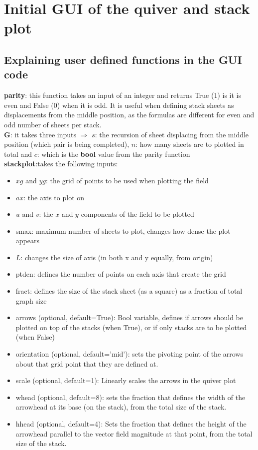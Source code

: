 \documentclass[11]{report}
\begin{document}
\section{Initial GUI of the quiver and stack plot}

\subsection{Explaining user defined functions in the GUI code}

\textbf{parity}: this function takes an input of an integer and returns True ($1$) is it is even and False ($0$) when it is odd. It is useful when defining stack sheets as displacements from the middle position, as the formulas are different for even and odd number of sheets per stack.\\
\textbf{G}: it takes three inputs $\Rightarrow$ $s$: the recursion of sheet displacing from the middle position (which pair is being completed), $n$: how many sheets are to plotted in total and $c$: which is the \textbf{bool} value from the parity function\\
\textbf{stack\textunderscore plot}:takes the following inputs:
\begin{itemize}
	\item $xg$ and $yg$: the grid of points to be used when plotting the field
	\item $ax$: the axis to plot on
	\item $u$ and $v$: the $x$ and $y$ components of the field to be plotted
	\item s\textunderscore max: maximum number of sheets to plot, changes how dense the plot appears
	\item $L$: changes the size of axis (in both x and y equally, from origin)
	\item pt\textunderscore den: defines the number of points on each axis that create the grid
	\item fract: defines the size of the stack sheet (as a square) as a fraction of total graph size
	\item arrows (optional, default=True): Bool variable, defines if arrows should be plotted on top of the stacks (when True), or if only stacks are to be plotted (when False)
	\item orientation (optional, default='mid'): sets the pivoting point of the arrows about that grid point that they are defined at.
	\item scale (optional, default=1): Linearly scales the arrows in the quiver plot
	\item w\textunderscore head (optional, default=8): sets the fraction that defines the width of the arrowhead at its base (on the stack), from the total size of the stack.
	\item h\textunderscore head (optional, default=4): Sets the fraction that defines the height of the arrowhead parallel to the vector field magnitude at that point, from the total size of the stack.
\end{itemize}
\end{document}
